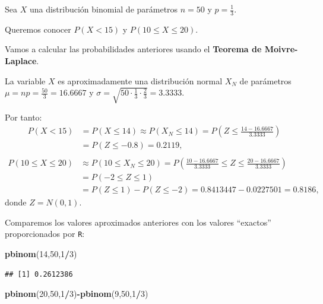 \documentclass[]{book}
\newenvironment{Shaded}{\begin{snugshade}}{\end{snugshade}}
\newcommand{\DecValTok}[1]{\textcolor[rgb]{0.00,0.00,0.81}{#1}}
\newcommand{\KeywordTok}[1]{\textcolor[rgb]{0.13,0.29,0.53}{\textbf{#1}}}
\newcommand{\NormalTok}[1]{#1}
\newcommand{\OperatorTok}[1]{\textcolor[rgb]{0.81,0.36,0.00}{\textbf{#1}}}
\begin{document}
Sea \(X\) una distribución binomial de parámetros \(n=50\) y \(p=\frac{1}{3}\).

Queremos conocer \(P(X < 15)\) y \(P(10\leq X\leq 20)\).

Vamos a calcular las probabilidades anteriores usando el \textbf{Teorema de Moivre-Laplace}.

La variable \(X\) es aproximadamente una distribución normal \(X_N\) de parámetros \(\mu = np=\frac{50}{3}=16.6667\) y \(\sigma=\sqrt{50\cdot\frac{1}{3}\cdot \frac{2}{3}}=3.3333\).

Por tanto:
\[
\begin{array}{rl}
P(X< 15) 
& = P(X\leq 14) \approx P(X_N \leq 14)=P\left(Z\leq \frac{14-16.6667}{3.3333}\right)\\& 
=P(Z\leq -0.8) = 0.2119,\\
\end{array}
\]
\[
\begin{array}{rl}
P(10\leq X\leq 20) 
& \approx P(10\leq X_N \leq 20) = P\left(\frac{10-16.6667}{3.3333}\leq  Z\leq \frac{20-16.6667}{3.3333}\right) \\ 
& = P(-2\leq Z\leq 1) \\ 
& = P(Z\leq 1)-P(Z\leq -2)=0.8413447-0.0227501 = 0.8186,
\end{array}
\]
donde \(Z=N(0,1)\).

Comparemos los valores aproximados anteriores con los valores ``exactos'' proporcionados por \texttt{R}:

\begin{Shaded}
\begin{Highlighting}[]
\KeywordTok{pbinom}\NormalTok{(}\DecValTok{14}\NormalTok{,}\DecValTok{50}\NormalTok{,}\DecValTok{1}\OperatorTok{/}\DecValTok{3}\NormalTok{)}
\end{Highlighting}
\end{Shaded}

\begin{verbatim}
## [1] 0.2612386
\end{verbatim}

\begin{Shaded}
\begin{Highlighting}[]
\KeywordTok{pbinom}\NormalTok{(}\DecValTok{20}\NormalTok{,}\DecValTok{50}\NormalTok{,}\DecValTok{1}\OperatorTok{/}\DecValTok{3}\NormalTok{)}\OperatorTok{-}\KeywordTok{pbinom}\NormalTok{(}\DecValTok{9}\NormalTok{,}\DecValTok{50}\NormalTok{,}\DecValTok{1}\OperatorTok{/}\DecValTok{3}\NormalTok{)}
\end{Highlighting}
\end{Shaded}
\end{document}
